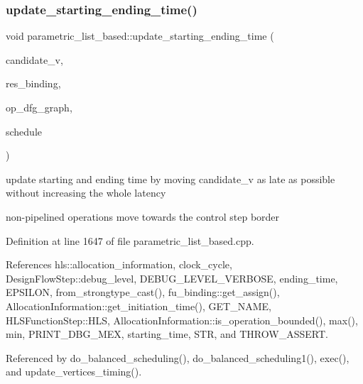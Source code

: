 \subsubsection{\texorpdfstring{update\+\_\+starting\+\_\+ending\+\_\+time()}{update\_starting\_ending\_time()}}
{\footnotesize\ttfamily void parametric\+\_\+list\+\_\+based\+::update\+\_\+starting\+\_\+ending\+\_\+time (\begin{DoxyParamCaption}\item[{\hyperlink{graph_8hpp_abefdcf0544e601805af44eca032cca14}{vertex}}]{candidate\+\_\+v,  }\item[{\hyperlink{fu__binding_8hpp_a619181df8ab98d7b7e17de58ac44b065}{fu\+\_\+binding\+Ref}}]{res\+\_\+binding,  }\item[{\hyperlink{op__graph_8hpp_a9a0b240622c47584bee6951a6f5de746}{Op\+Graph\+Const\+Ref}}]{op\+\_\+dfg\+\_\+graph,  }\item[{const \hyperlink{schedule_8hpp_a85e4dea8a1611026193d8ca13fc5a260}{Schedule\+Const\+Ref}}]{schedule }\end{DoxyParamCaption})\hspace{0.3cm}{\ttfamily [private]}}



update starting and ending time by moving candidate\+\_\+v as late as possible without increasing the whole latency 

non-\/pipelined operations move towards the control step border 

Definition at line 1647 of file parametric\+\_\+list\+\_\+based.\+cpp.



References hls\+::allocation\+\_\+information, clock\+\_\+cycle, Design\+Flow\+Step\+::debug\+\_\+level, D\+E\+B\+U\+G\+\_\+\+L\+E\+V\+E\+L\+\_\+\+V\+E\+R\+B\+O\+SE, ending\+\_\+time, E\+P\+S\+I\+L\+ON, from\+\_\+strongtype\+\_\+cast(), fu\+\_\+binding\+::get\+\_\+assign(), Allocation\+Information\+::get\+\_\+initiation\+\_\+time(), G\+E\+T\+\_\+\+N\+A\+ME, H\+L\+S\+Function\+Step\+::\+H\+LS, Allocation\+Information\+::is\+\_\+operation\+\_\+bounded(), max(), min, P\+R\+I\+N\+T\+\_\+\+D\+B\+G\+\_\+\+M\+EX, starting\+\_\+time, S\+TR, and T\+H\+R\+O\+W\+\_\+\+A\+S\+S\+E\+RT.



Referenced by do\+\_\+balanced\+\_\+scheduling(), do\+\_\+balanced\+\_\+scheduling1(), exec(), and update\+\_\+vertices\+\_\+timing().

